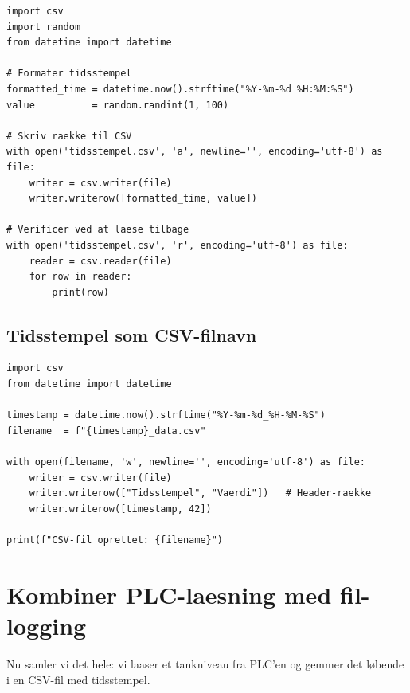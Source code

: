\documentclass[12pt, a4paper]{article}
\begin{document}
\begin{tcolorbox}[pythonbox, title={\faPython\quad Kode 5 --- Tidsstempel og tilfaeldig vaerdi i CSV}]
\begin{verbatim}
import csv
import random
from datetime import datetime

# Formater tidsstempel
formatted_time = datetime.now().strftime("%Y-%m-%d %H:%M:%S")
value          = random.randint(1, 100)

# Skriv raekke til CSV
with open('tidsstempel.csv', 'a', newline='', encoding='utf-8') as file:
    writer = csv.writer(file)
    writer.writerow([formatted_time, value])

# Verificer ved at laese tilbage
with open('tidsstempel.csv', 'r', encoding='utf-8') as file:
    reader = csv.reader(file)
    for row in reader:
        print(row)
\end{verbatim}
\end{tcolorbox}

\subsection{Tidsstempel som CSV-filnavn}

\begin{tcolorbox}[pythonbox, title={\faPython\quad Kode 6 --- Tidsstempel som CSV-filnavn}]
\begin{verbatim}
import csv
from datetime import datetime

timestamp = datetime.now().strftime("%Y-%m-%d_%H-%M-%S")
filename  = f"{timestamp}_data.csv"

with open(filename, 'w', newline='', encoding='utf-8') as file:
    writer = csv.writer(file)
    writer.writerow(["Tidsstempel", "Vaerdi"])   # Header-raekke
    writer.writerow([timestamp, 42])

print(f"CSV-fil oprettet: {filename}")
\end{verbatim}
\end{tcolorbox}

\section{Kombiner PLC-laesning med fil-logging}

Nu samler vi det hele: vi laaser et tankniveau fra PLC'en og gemmer det
løbende i en CSV-fil med tidsstempel.
\end{document}
